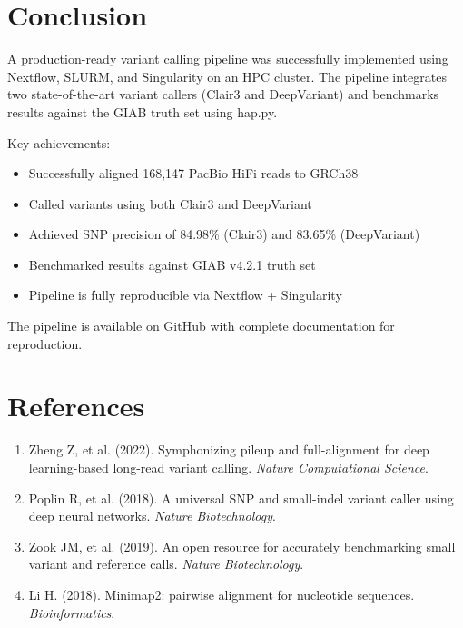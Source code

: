 \documentclass[12pt,a4paper]{article}
\begin{document}
\section{Conclusion}

A production-ready variant calling pipeline was successfully implemented using Nextflow, SLURM, and Singularity on an HPC cluster. The pipeline integrates two state-of-the-art variant callers (Clair3 and DeepVariant) and benchmarks results against the GIAB truth set using hap.py.

Key achievements:
\begin{itemize}
    \item Successfully aligned 168,147 PacBio HiFi reads to GRCh38
    \item Called variants using both Clair3 and DeepVariant
    \item Achieved SNP precision of 84.98\% (Clair3) and 83.65\% (DeepVariant)
    \item Benchmarked results against GIAB v4.2.1 truth set
    \item Pipeline is fully reproducible via Nextflow + Singularity
\end{itemize}

The pipeline is available on GitHub with complete documentation for reproduction.

\section*{References}
\begin{enumerate}
    \item Zheng Z, et al. (2022). Symphonizing pileup and full-alignment for deep learning-based long-read variant calling. \textit{Nature Computational Science}.
    \item Poplin R, et al. (2018). A universal SNP and small-indel variant caller using deep neural networks. \textit{Nature Biotechnology}.
    \item Zook JM, et al. (2019). An open resource for accurately benchmarking small variant and reference calls. \textit{Nature Biotechnology}.
    \item Li H. (2018). Minimap2: pairwise alignment for nucleotide sequences. \textit{Bioinformatics}.
\end{enumerate}
\end{document}
